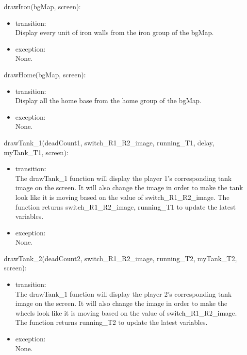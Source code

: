 \documentclass[12pt, titlepage]{article}
\begin{document}
	    drawIron(bgMap, screen):
	    \begin{itemize}
	    \item transition:\\
	    Display every unit of iron walls from the iron group of the bgMap.\\
	    
	    \item exception:\\ None.
	    \end{itemize}
	    
	    drawHome(bgMap, screen):
	    \begin{itemize}
	    \item transition:\\
	    Display all the home base from the home group of the bgMap.\\
	    
	    \item exception:\\ None.
	    \end{itemize}
	    
	    drawTank\_1(deadCount1, switch\_R1\_R2\_image, running\_T1, delay, myTank\_T1, screen):
	    \begin{itemize}
	    \item transition:\\
	    The drawTank\_1 function will display the player 1's corresponding tank image on the screen. It will also change the image in order to make the tank look like it is moving based on the value of switch\_R1\_R2\_image. The function returns switch\_R1\_R2\_image, running\_T1 to update the latest variables.\\
	    
	    \item exception:\\ None.
	    \end{itemize}
	    
	    drawTank\_2(deadCount2, switch\_R1\_R2\_image, running\_T2, myTank\_T2, screen):
	    \begin{itemize}
	    \item transition:\\
	    The drawTank\_1 function will display the player 2's corresponding tank image on the screen. It will also change the image in order to make the wheels look like it is moving based on the value of switch\_R1\_R2\_image. The function returns running\_T2 to update the latest variables.\\
	    
	    \item exception:\\ None.
	    \end{itemize}
	    
\end{document}
